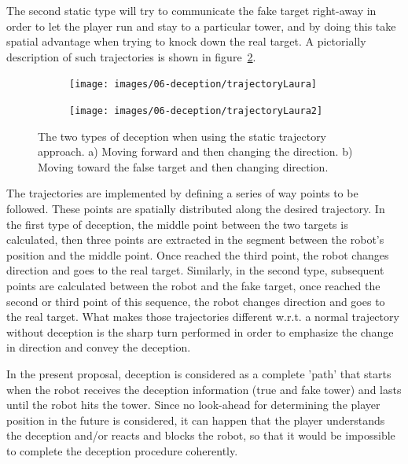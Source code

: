 The second static type will try to communicate the fake target right-away in order to let the player run and stay to a particular tower, and by doing this take spatial advantage when trying to knock down the real target. A pictorially description of such trajectories is shown in figure~\ref{fig:static_deception_2}.

\begin{figure}[h]
    \centering
    \begin{subfigure}[t]{0.45\columnwidth}
        \centering
        \texttt{[image: images/06-deception/trajectoryLaura]}
        \caption{}
        \label{fig:static_deception_1}
    \end{subfigure}
    \hspace{0.01\columnwidth}
    \begin{subfigure}[t]{0.45\columnwidth}
        \centering
        \texttt{[image: images/06-deception/trajectoryLaura2]}
        \caption{}
        \label{fig:static_deception_2}
    \end{subfigure}
    \caption{The two types of deception when using the static trajectory approach. a) Moving forward and then changing the direction. b) Moving toward the false target and then changing direction.}
    \label{fig::trajectoryStatic}
\end{figure}

The trajectories are implemented by defining a series of way points to be followed. These points are spatially distributed along the desired trajectory. In the first type of deception, the middle point between the two targets is calculated, then three points are extracted in the segment between the robot's position and the middle point. Once reached the third point, the robot changes direction and goes to the real target. Similarly, in the second type, subsequent points are calculated between the robot and the fake target, once reached the second or third point of this sequence, the robot changes direction and goes to the real target. What makes those trajectories different w.r.t. a normal trajectory without deception is the sharp turn performed in order to emphasize the change in direction and convey the deception.

In the present proposal, deception is considered as a complete 'path' that starts when the robot receives the deception information (true and fake tower) and lasts until the robot hits the tower. Since no look-ahead for determining the player position in the future is considered, it can happen that the player understands the deception and/or  reacts and blocks the robot, so that it would be impossible to complete the deception procedure coherently.


